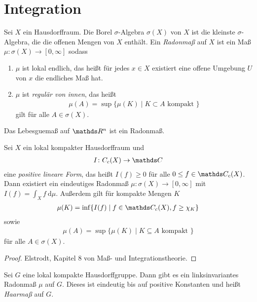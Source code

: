 \chapter{Integration}
\begin{defi}
Sei $X$ ein Hausdorffraum. Die Borel $\sigma$-Algebra $\sigma(X)$ von $X$ ist die kleinste $\sigma$-Algebra, die die offenen Mengen von $X$ enthält.
Ein \emph{Radonmaß} auf $X$ ist ein Maß $\mu \colon \sigma(X) \to [0,\infty]$ sodass
\begin{enumerate}[label=\roman*)]
\item $\mu$ ist lokal endlich, das heißt für jedes $x\in X$ existiert eine offene Umgebung $U$ von $x$ die endliches Maß hat.
\item $\mu$ ist \emph{regulär von innen}, das heißt
\begin{align*}
\mu(A)=\sup\{\mu(K)\mid K\subset A \text{ kompakt }\}
\end{align*}
gilt für alle $A \in \sigma(X)$.
\end{enumerate}
\end{defi}

\begin{bsp}
Das Lebesguemaß auf $\Rn$ ist ein Radonmaß.
\end{bsp}

\begin{thm}[Riesz]
Sei $X$ ein lokal kompakter Hausdorffraum und
\begin{align*}
I \colon C_c(X) \to \C
\end{align*}
eine \emph{positive lineare Form}, das heißt $I(f)\geq 0$ für alle $0\leq f \in \C_c(X)$.
Dann existiert ein eindeutiges Radonmaß $\mu \colon \sigma(X)\to [0,\infty]$ mit $I(f)=\int_X f ~\mathrm{d}\mu$.
Außerdem gilt für kompakte Mengen $K$
\begin{align*}
\mu(K)=\inf\{I(f)\mid f\in \C_c(X),f \geq \chi_K\}
\end{align*}
sowie
\begin{align*}
\mu(A)=\sup\{\mu(K)\mid K\subseteq A \text{ kompakt } \}
\end{align*}
für alle $A \in \sigma(X)$.
\end{thm}
\begin{proof}
Elstrodt, Kapitel 8 von Maß- und Integrationstheorie.
\end{proof}

\begin{thm}[Haar]
Sei $G$ eine lokal kompakte Hausdorffgruppe.
Dann gibt es ein linksinvariantes Radonmaß $\mu$ auf $G$.
Dieses ist eindeutig bis auf positive Konstanten und heißt \emph{Haarmaß} auf $G$.
\end{thm}

